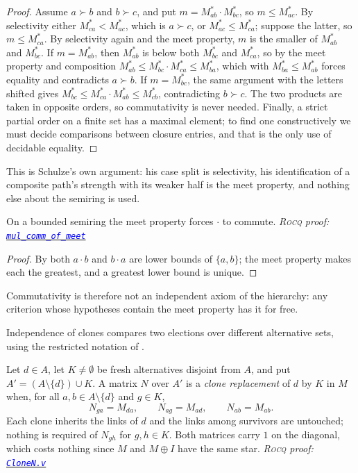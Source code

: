 \documentclass[a4paper,UKenglish,cleveref,autoref,thm-restate,anonymous]{lipics-v2021}
\newcommand{\Mstar}{M^{\ast}}
\newcommand{\rocq}{\textsc{Rocq}}
\newcommand{\anonrepo}{https://anonymous.4open.science/r/Semiring_graph_algorithm-000E}
\newcommand{\rocqfile}[2]{\href{\anonrepo/#1}{\textcolor{blue}{\texttt{#2}}}}
\newcommand{\proofat}[2]{{\footnotesize\itshape\rocq{} proof: \rocqfile{#1}{#2}}}
\begin{document}
\begin{proof}
Assume $a \succ b$ and $b \succ c$, and put
$m = \Mstar_{ab}\cdot\Mstar_{bc}$, so $m \leq \Mstar_{ac}$. By selectivity
either $\Mstar_{ca} < \Mstar_{ac}$, which is $a \succ c$, or
$\Mstar_{ac} \leq \Mstar_{ca}$; suppose the latter, so $m \leq \Mstar_{ca}$.
By selectivity again and the meet property, $m$ is the smaller of
$\Mstar_{ab}$ and $\Mstar_{bc}$. If $m = \Mstar_{ab}$, then $\Mstar_{ab}$ is
below both $\Mstar_{bc}$ and $\Mstar_{ca}$, so by the meet property and
composition
$\Mstar_{ab} \leq \Mstar_{bc}\cdot\Mstar_{ca} \leq \Mstar_{ba}$, which with
$\Mstar_{ba} \leq \Mstar_{ab}$ forces equality and contradicts $a \succ b$.
If $m = \Mstar_{bc}$, the same argument with the letters shifted gives
$\Mstar_{bc} \leq \Mstar_{ca}\cdot\Mstar_{ab} \leq \Mstar_{cb}$,
contradicting $b \succ c$. The two products are taken in opposite orders,
so commutativity is never needed. Finally, a strict partial order on a
finite set has a maximal element; to find one constructively we must
decide comparisons between closure entries, and that is the only use of
decidable equality.
\end{proof}

This is Schulze's own argument: his case split is selectivity, his
identification of a composite path's strength with its weaker half is the
meet property, and nothing else about the semiring is used.

\begin{lemma}\label{lem:commfree}
On a bounded semiring the meet property forces $\cdot$ to commute.
\proofat{algorithm/SchulzeOrderN.v}{mul\_comm\_of\_meet}
\end{lemma}

\begin{proof}
By  both $a\cdot b$ and $b\cdot a$ are lower bounds of
$\{a,b\}$; the meet property makes each the greatest, and a greatest lower
bound is unique.
\end{proof}

Commutativity is therefore not an independent axiom of the hierarchy: any
criterion whose hypotheses contain the meet property has it for free.

Independence of clones compares two elections over different alternative
sets, using the restricted notation of .

\begin{definition}\label{def:clone}
Let $d \in A$, let $K \neq \emptyset$ be fresh alternatives disjoint from
$A$, and put $A' = (A \setminus \{d\}) \cup K$. A matrix $N$ over $A'$ is a
\emph{clone replacement} of $d$ by $K$ in $M$ when, for all
$a, b \in A \setminus \{d\}$ and $g \in K$,
\[
  N_{ga} = M_{da}, \qquad N_{ag} = M_{ad}, \qquad N_{ab} = M_{ab}.
\]
Each clone inherits the links of $d$ and the links among survivors are
untouched; nothing is required of $N_{gh}$ for $g, h \in K$. Both matrices
carry $1$ on the diagonal, which costs nothing since $M$ and $M \oplus I$
have the same star.
\proofat{algorithm/CloneN.v}{CloneN.v}
\end{definition}
\end{document}
